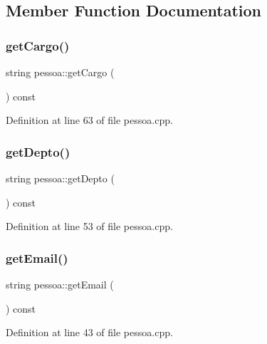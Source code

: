 \subsection{Member Function Documentation}
\hypertarget{classpessoa_aa4b0643f31c9d0e338ca7a485bc0723d}{}\label{classpessoa_aa4b0643f31c9d0e338ca7a485bc0723d} 
\subsubsection{\texorpdfstring{get\+Cargo()}{getCargo()}}
{\footnotesize\ttfamily string pessoa\+::get\+Cargo (\begin{DoxyParamCaption}{ }\end{DoxyParamCaption}) const}



Definition at line 63 of file pessoa.\+cpp.

\hypertarget{classpessoa_a7e0858513abeb0579b987e7a7a79f0d7}{}\label{classpessoa_a7e0858513abeb0579b987e7a7a79f0d7} 
\subsubsection{\texorpdfstring{get\+Depto()}{getDepto()}}
{\footnotesize\ttfamily string pessoa\+::get\+Depto (\begin{DoxyParamCaption}{ }\end{DoxyParamCaption}) const}



Definition at line 53 of file pessoa.\+cpp.

\hypertarget{classpessoa_a41fc2c5db3716b88356b23987fd14bb4}{}\label{classpessoa_a41fc2c5db3716b88356b23987fd14bb4} 
\subsubsection{\texorpdfstring{get\+Email()}{getEmail()}}
{\footnotesize\ttfamily string pessoa\+::get\+Email (\begin{DoxyParamCaption}{ }\end{DoxyParamCaption}) const}



Definition at line 43 of file pessoa.\+cpp.

\hypertarget{classpessoa_ad1bad474adbfadf472ad857a7c5f181c}{}\label{classpessoa_ad1bad474adbfadf472ad857a7c5f181c} 
